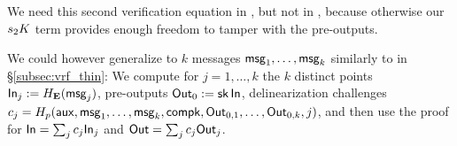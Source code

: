 We need this second verification equation in \PedVRF, but not in \ThinVRF,
because otherwise our $s_2 K$ term provides enough freedom to tamper
with the pre-outputs.  

We could however generalize \PedVRF to $k$ messages $\mathsf{msg}_1,\ldots,\mathsf{msg}_k$
similarly to \ThinVRF in \S\ref{subsec:vrf_thin}:  We compute for
$j=1,\ldots,k$ the $k$ distinct
points ${\mathsf{In}}_j := H_{{\mathbf{E}}}(\mathsf{msg}_j)$, pre-outputs ${\mathsf{Out}}_0 := \mathsf{sk} \, {\mathsf{In}}$,
delinearization challenges
 $c_j = H_p(\mathsf{aux},\mathsf{msg}_1,\ldots,\mathsf{msg}_k,\mathsf{compk},{\mathsf{Out}}_{0,1},\ldots,{\mathsf{Out}}_{0,k},j)$,
and then use the \PedVRF proof for
 ${\mathsf{In}} = \sum_j c_j {\mathsf{In}}_j$ and ${\mathsf{Out}} = \sum_j c_j {\mathsf{Out}}_j$.








